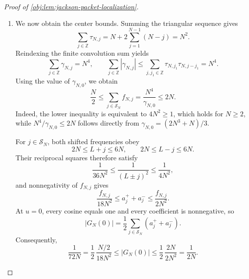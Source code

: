 \begin{proof}[Proof of \cref{obj:lem:jackson-packet-localization}]
\begin{enumerate}
For completeness, cosine orthogonality reads, for \(j_1,j\in\mathbb Z\),
\[
\int_{-\pi}^{\pi}\cos(j_1u)\cos(ju)\,\frac{du}{2\pi}
=
\begin{cases}
1,&j_1=j=0,\\
\frac12,&|j_1|=|j|\neq0,\\
0,&\text{otherwise}.
\end{cases}
\]
This follows by the cosine product identity and integration of the integer modes. The sine part of the Fourier integral vanishes because \(\mathcal J_N\) is even. Hence
\[
\widehat{\mathcal J_N}(j)
=
\begin{cases}
f_{N,0},&j=0,\\
\dfrac{f_{N,j}+f_{N,-j}}2,&j\neq0,
\end{cases}
=f_{N,j}.
\]
In particular, the zero-extended sequences in the statement satisfy
\[
a_j^\pm=
\begin{cases}
f_{N,j}(L\pm j)^{-2},&j\in\mathcal S_N,\\
0,&j\notin\mathcal S_N.
\end{cases}
\]

\item We now obtain the center bounds. Summing the triangular sequence gives
\[
\sum_{j\in\mathbb Z}\tau_{N,j}
=N+2\sum_{j=1}^{N-1}(N-j)=N^2.
\]
Reindexing the finite convolution sum yields
\[
\sum_{j\in\mathbb Z}\gamma_{N,j}=N^4,
\qquad
\sum_{j\in\mathbb Z}|\gamma_{N,j}|
\leq
\sum_{j,j_1\in\mathbb Z}
\tau_{N,j_1}\tau_{N,j-j_1}
=N^4.
\]
Using the value of \(\gamma_{N,0}\), we obtain
\[
\frac N2
\leq
\sum_{j\in\mathcal S_N}f_{N,j}
=\frac{N^4}{\gamma_{N,0}}
\leq2N.
\]
Indeed, the lower inequality is equivalent to \(4N^2\geq1\), which holds for \(N\geq2\), while
\(N^4/\gamma_{N,0}\leq2N\) follows directly from
\(\gamma_{N,0}=(2N^3+N)/3\).

For \(j\in\mathcal S_N\), both shifted frequencies obey
\[
2N\leq L+j\leq6N,\qquad
2N\leq L-j\leq6N.
\]
Their reciprocal squares therefore satisfy
\[
\frac1{36N^2}\leq\frac1{(L\pm j)^2}\leq\frac1{4N^2},
\]
and nonnegativity of \(f_{N,j}\) gives
\[
\frac{f_{N,j}}{18N^2}
\leq a_j^++a_j^-
\leq\frac{f_{N,j}}{2N^2}.
\]
At \(u=0\), every cosine equals one and every coefficient is nonnegative, so
\[
|G_N(0)|=\frac12\sum_{j\in\mathcal S_N}(a_j^++a_j^-).
\]
Consequently,
\[
\frac1{72N}
=
\frac12\,\frac{N/2}{18N^2}
\leq |G_N(0)|
\leq
\frac12\,\frac{2N}{2N^2}
=\frac1{2N}.
\]


\end{enumerate}
\end{proof}
